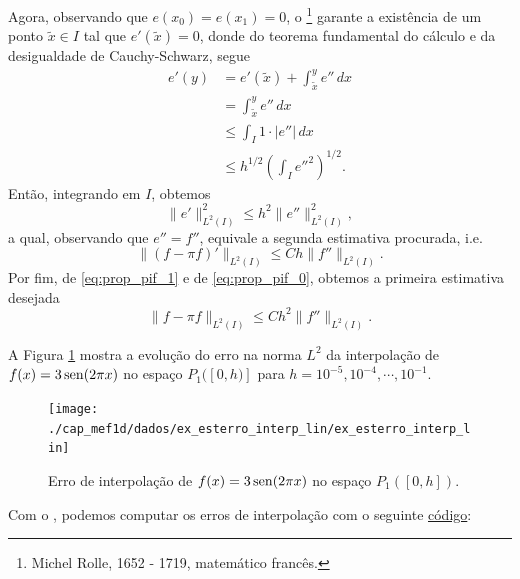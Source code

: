 \begin{dem}
Agora, observando que $e(x_0)=e(x_1)=0$, o \footnote{Michel Rolle, 1652 - 1719, matemático francês.} garante a existência de um ponto $\tilde{x}\in I$ tal que $e'(\tilde{x})=0$, donde do teorema fundamental do cálculo e da desigualdade de Cauchy-Schwarz, segue
\begin{align}
  e'(y) &= e'(\tilde{x}) + \int_{\tilde{x}}^y e''\,dx \\
        &= \int_{\tilde{x}}^y e''\,dx\\
        &\leq \int_{I}1\cdot |e''|\,dx\\
        &\leq h^{1/2}\left(\int_I e''^2\right)^{1/2}.
\end{align}
Então, integrando em $I$, obtemos
\begin{equation}\label{eq:prop_pif_1}
  \|e'\|_{L^2(I)}^2 \leq h^2\|e''\|_{L^2(I)}^2,
\end{equation}
a qual, observando que $e'' = f''$, equivale a segunda estimativa procurada, i.e.
\begin{equation}
  \|(f-\pi f)'\|_{L^2(I)} \leq C h \|f''\|_{L^2(I)}.
\end{equation}
Por fim, de \eqref{eq:prop_pif_1} e de \eqref{eq:prop_pif_0}, obtemos a primeira estimativa desejada
\begin{equation}
  \|f - \pi f\|_{L^2(I)} \leq C h^2 \|f''\|_{L^2(I)}.
\end{equation}
\end{dem}

\begin{ex}\label{ex:esterro_interp_lin}
  A Figura \ref{fig:ex_esterro_interp_lin} mostra a evolução do erro na norma $L^2$ da interpolação de $f(x)=3\operatorname{sen}(2\pi x)$ no espaço $P_1([0, h)]$ para $h=10^{-5}, 10^{-4}, \cdots, 10^{-1}$.

  \begin{figure}[h!]
    \centering
    \texttt{[image: ./cap\_mef1d/dados/ex\_esterro\_interp\_lin/ex\_esterro\_interp\_lin]}
    \caption{Erro de interpolação de $f(x)=3\operatorname{sen}(2\pi x)$ no espaço $P_1([0, h])$.}
    \label{fig:ex_esterro_interp_lin}
  \end{figure}

\ifispython
Com o \fenics, podemos computar os erros de interpolação com o seguinte \href{https://github.com/phkonzen/notas/blob/master/src/MetodoElementosFinitos/cap_mef1d/dados/ex_esterro_interp_lin/ex_esterro_interp_lin.py}{código}:

\fi
\end{ex}



